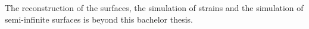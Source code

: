 	The reconstruction of the surfaces, the simulation of strains and the simulation of semi-infinite surfaces is beyond this bachelor thesis. 
%
%	
%	
	
	
	
	